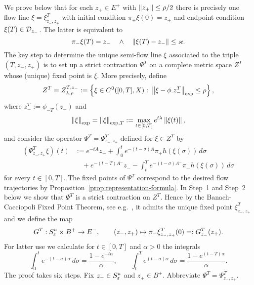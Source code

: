 \documentclass{article}
\begin{document}
We prove below that for each $z_+\in E^+$ with $\mathopen\|z_+\mathclose\| \le\rho/2$ there is precisely one
flow line $\xi=\xi_{z_-,z_+}^T$ with initial condition $\pi_+ \xi(0)=z_+$ and endpoint condition
$\xi(T)\in{\mathcal{D}}_{z_-}$. The latter is equivalent to
\begin{equation}\label{eq:xi-end}
     \pi_-\xi(T)={z_-}
     \quad\wedge\quad
     \Norm{\xi(T)-{z_-}}\le\varkappa.
\end{equation} 
The key step to determine the unique semi-flow line $\xi$ associated
to the triple $(T,{z_-},z_+)$ is to set up a strict contraction $\Psi^T$ on a complete
metric space $Z^T$ whose (unique) fixed point is $\xi$. More precisely, define
\begin{equation}\label{eq:ZT}
     Z^T
     =Z^{T,{z_-}}_{\lambda,\rho}
     :=\left\{
     \xi\in
     C^0([0,T],X)\,\colon
     \Norm{\xi-\phi_\cdot{z_-^T}}
     _{\exp}
     \le\rho\right\},
\end{equation}
where ${z_-^T}:=\phi_{-T}({z_-})$ and
\begin{equation}\label{eq:exp-T}
     \Norm{\xi}_{\exp}
     =\Norm{\xi}_{\exp,T}
     :=\max_{t\in[0,T]} 
     e^{t\lambda}
     \Norm{\xi(t)},
\end{equation}
and consider the operator
$\Psi^T=\Psi^T_{{z_-},z_+}$ defined for
$\xi\in Z^T$ by
\begin{equation}\label{eq:Psi}
\begin{split}
     \left(\Psi_{{z_-},z_+}^T
     \xi\right)(t)
    &:=e^{-tA}z_+
     +\int_0^t e^{-(t-\sigma)A}\pi_+
     h(\xi(\sigma))
     \, d\sigma
     \\
    &\quad
     +e^{-(t-T)A^-}{z_-}
     -\int_t^T e^{-(t-\sigma)A^-}\pi_-
     h(\xi(\sigma))
     \, d\sigma
\end{split}
\end{equation}
for every $t\in[0,T]$. The fixed points of $\Psi^T$ correspond to the desired flow
trajectories by Proposition~\ref{prop:representation-formula}.
In Step~1 and Step~2 below we show that $\Psi^T$ is a strict contraction on $Z^T$. Hence by the
Banach-Cacciopoli Fixed Point Theorem, see e.g.~\cite[\S 2.2]{chow:1982a},
it admits the unique fixed point $\xi_{{z_-},z_+}^T$ and we define the map
\begin{equation}\label{eq:G^T}
     G^T:S^u_\eps\times B^+\to E^-
     ,\qquad
     \left({z_-},z_+\right)\mapsto 
     \pi_-\xi_{{z_-},z_+}^T(0)
     =:G^T_{z_-}(z_+).
\end{equation}
For latter use we calculate for $t\in[0,T]$ and $\alpha>0$ the integrals
\begin{equation}\label{eq:int-1}
     \int_0^t e^{-(t-\sigma)\alpha}\, d\sigma
     =\frac{1-e^{-t\alpha}}{\alpha}
     ,\qquad
     \int_t^T e^{(t-\sigma)\alpha}\, d\sigma
     =\frac{1-e^{(t-T)\alpha}}{\alpha}.
\end{equation}
The proof takes six steps. Fix ${z_-}\in S^u_{\varepsilon}$ and $z_+\in B^+$. Abbreviate $\Psi^T=\Psi_{{z_-},z_+}^T$.
\end{document}
